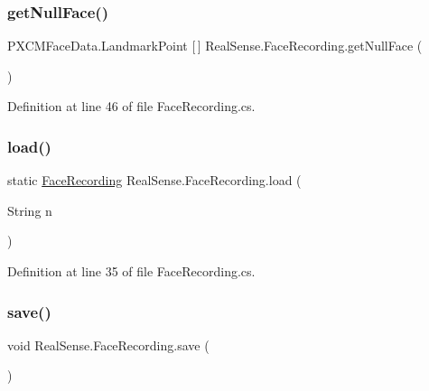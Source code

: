 \subsubsection{\texorpdfstring{get\+Null\+Face()}{getNullFace()}}
{\footnotesize\ttfamily P\+X\+C\+M\+Face\+Data.\+Landmark\+Point \mbox{[}$\,$\mbox{]} Real\+Sense.\+Face\+Recording.\+get\+Null\+Face (\begin{DoxyParamCaption}{ }\end{DoxyParamCaption})}



Definition at line 46 of file Face\+Recording.\+cs.

\mbox{\label{class_real_sense_1_1_face_recording_a61d844c987701d6a21c0ce83333bdf14}} 
\subsubsection{\texorpdfstring{load()}{load()}}
{\footnotesize\ttfamily static \hyperlink{class_real_sense_1_1_face_recording}{Face\+Recording} Real\+Sense.\+Face\+Recording.\+load (\begin{DoxyParamCaption}\item[{String}]{n }\end{DoxyParamCaption})\hspace{0.3cm}{\ttfamily [static]}}



Definition at line 35 of file Face\+Recording.\+cs.

\mbox{\label{class_real_sense_1_1_face_recording_aab0ad08e511ae94dbabe32a483a395ca}} 
\subsubsection{\texorpdfstring{save()}{save()}}
{\footnotesize\ttfamily void Real\+Sense.\+Face\+Recording.\+save (\begin{DoxyParamCaption}{ }\end{DoxyParamCaption})}



